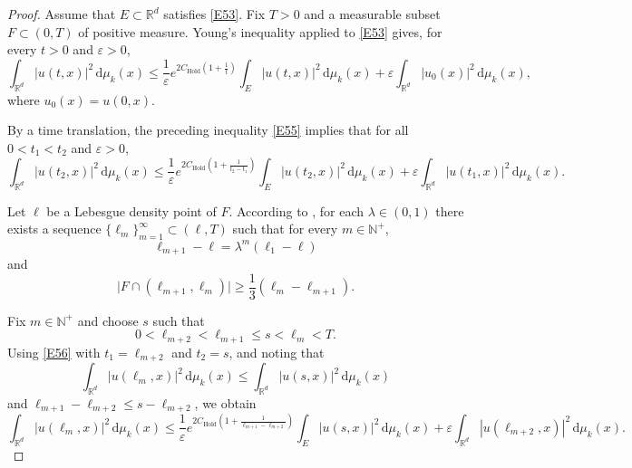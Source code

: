 \documentclass[12pt]{article}
\begin{document}
\begin{proof}
Assume that $E \subset \mathbb{R}^d$ satisfies \eqref{E53}. Fix $T > 0$ and a measurable subset $F\subset (0,T)$ of positive measure. %
Young's inequality applied to \eqref{E53} gives, for every $t>0$ and $\varepsilon>0$,
\begin{equation}\label{E55}
\int_{\mathbb{R}^d} |u(t,x)|^2 \, \mathrm{d}\mu_k(x)
\le \frac{1}{\varepsilon}e^{2C_{\mathrm{Hold}}\left(1+\frac{1}{t}\right)}
\int_{E} |u(t,x)|^2 \, \mathrm{d}\mu_k(x)
+ \varepsilon \int_{\mathbb{R}^d} |u_0(x)|^2 \, \mathrm{d}\mu_k(x),
\end{equation}
where $u_0(x)=u(0,x)$.

By a time translation, the preceding inequality \eqref{E55} implies that for all $0 < t_1 < t_2$ and $\varepsilon > 0$,
\begin{equation}\label{E56}
\int_{\mathbb{R}^d} |u(t_2,x)|^2 \, \mathrm{d}\mu_k(x)
\le \frac{1}{\varepsilon}e^{2C_{\mathrm{Hold}}\left(1+\frac{1}{t_2-t_1}\right)}
\int_{E} |u(t_2,x)|^2 \, \mathrm{d}\mu_k(x)
+ \varepsilon \int_{\mathbb{R}^d} |u(t_1,x)|^2 \, \mathrm{d}\mu_k(x).
\end{equation}

Let $\ell$ be a Lebesgue density point of $F$. According to \cite[Proposition~2.1]{KDP}, for each $\lambda \in (0,1)$ there exists a sequence $\{\ell_m\}_{m=1}^\infty \subset (\ell,T)$ such that for every $m \in \mathbb{N}^+$,
\begin{equation}\label{E57}
\ell_{m+1} - \ell = \lambda^m(\ell_1 - \ell)
\end{equation}
and
\begin{equation}\label{E58}
\bigl|F \cap (\ell_{m+1},\ell_m)\bigr| \ge \frac{1}{3}(\ell_m - \ell_{m+1}).
\end{equation}

Fix $m \in \mathbb{N}^+$ and choose $s$ such that
\[
0 < \ell_{m+2} < \ell_{m+1} \le s < \ell_m < T.
\]
Using \eqref{E56} with $t_1 = \ell_{m+2}$ and $t_2 = s$, and noting that
\[
\int_{\mathbb{R}^d} |u(\ell_m,x)|^2 \, \mathrm{d}\mu_k(x) \le \int_{\mathbb{R}^d} |u(s,x)|^2 \, \mathrm{d}\mu_k(x)
\]
and $\ell_{m+1}-\ell_{m+2}\le s-\ell_{m+2}$, we obtain
\begin{equation}\label{E59}
\int_{\mathbb{R}^d} |u(\ell_m,x)|^2 \, \mathrm{d}\mu_k(x)
\le \frac{1}{\varepsilon}e^{2C_{\mathrm{Hold}}\left(1+\frac{1}{\ell_{m+1}-\ell_{m+2}}\right)}
\int_{E} |u(s,x)|^2 \, \mathrm{d}\mu_k(x)
+ \varepsilon \int_{\mathbb{R}^d} |u(\ell_{m+2},x)|^2 \, \mathrm{d}\mu_k(x).
\end{equation}



\end{proof}
\end{document}
